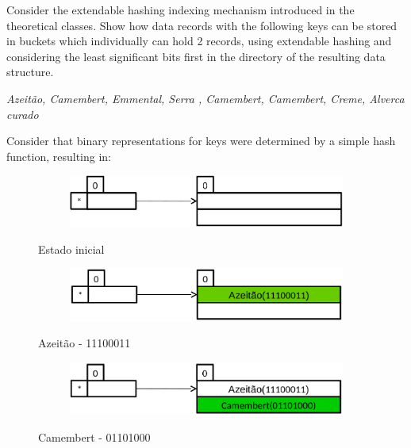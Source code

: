 {\color{gray}Consider the extendable hashing indexing mechanism introduced in the theoretical classes. Show how data records with the following keys can be stored in buckets which individually can hold 2 records, using extendable hashing and considering the least significant bits first in the directory of the resulting data structure.}

\textit{\color{gray}Azeitão, Camembert, Emmental, Serra , Camembert, Camembert, Creme, Alverca curado}

{\color{gray}Consider that binary representations for keys were determined by a simple hash function, resulting in:}


\begin{figure}[H]
	\begin{center}
	\begin{subfigure}[b]{0.5\textwidth}
		\centering
		\includegraphics[width=\textwidth]{fig1.png}

	\end{subfigure}
	\caption{Estado inicial}
	\end{center}
\end{figure}
\begin{figure}[H]
	\begin{center}
	\begin{subfigure}[b]{0.5\textwidth}
		\centering
		\includegraphics[width=\textwidth]{fig2.png}

	\end{subfigure}
	\caption{Azeitão - 11100011}
	\end{center}
\end{figure}
\begin{figure}[H]
	\begin{center}
	\begin{subfigure}[b]{0.5\textwidth}
		\centering
		\includegraphics[width=\textwidth]{fig3.png}

	\end{subfigure}
	\caption{Camembert - 01101000}
	\end{center}
\end{figure}
